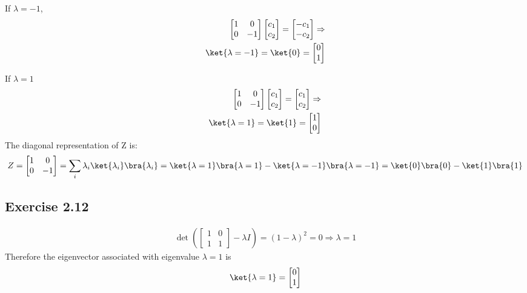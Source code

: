 \documentclass[a4paper,12pt]{article}
\begin{document}
If $\lambda = -1$,
\begin{align*}
	\begin{bmatrix}
		1 & 0 \\
	    0 & -1
	\end{bmatrix}
	\begin{bmatrix}
		c_1 \\
		c_2
	\end{bmatrix} =
	\begin{bmatrix}
		-c_1 \\
		-c_2
	\end{bmatrix}
	\Rightarrow \\ \ket{\lambda = -1} = \ket{0} =
	\begin{bmatrix}
	0 \\
	1
	\end{bmatrix}
\end{align*}

If $\lambda = 1$
\begin{align*}
        \begin{bmatrix}
		1 & 0 \\
	    0 & -1
	\end{bmatrix}
	\begin{bmatrix}
		c_1 \\
		c_2
	\end{bmatrix} =
	\begin{bmatrix}
		c_1 \\
		c_2
	\end{bmatrix}
	\Rightarrow \\ \ket{\lambda = 1} = \ket{1} =
	\begin{bmatrix}
	1 \\
	0
	\end{bmatrix}
\end{align*}
The diagonal representation of Z is:
\begin{align*}
Z = \begin{bmatrix}
	1 & 0 \\
	0 & -1
	\end{bmatrix}
	= \sum_i \lambda_i \ket{\lambda_i}\bra{\lambda_i}= \ket{\lambda=1}\bra{\lambda=1}-\ket{\lambda=-1}\bra{\lambda=-1} = \ket{0}\bra{0}-\ket{1}\bra{1}
\end{align*}


\subsection*{Exercise 2.12}
\begin{align*}
	\det \left(\begin{bmatrix}
	1 & 0 \\
	1 & 1
	\end{bmatrix} - \lambda I \right) = (1 - \lambda)^2 = 0 \Rightarrow \lambda = 1
\end{align*}
Therefore the eigenvector associated with eigenvalue $\lambda = 1$ is
\begin{align*}
	\ket{\lambda = 1} = \begin{bmatrix}
	0 \\
	1
	\end{bmatrix}
\end{align*}
\end{document}

